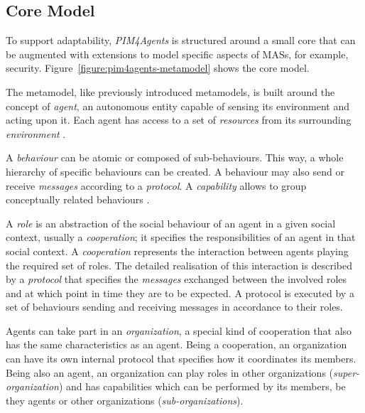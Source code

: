 \subsection*{Core Model}

To support adaptability, \textit{PIM4Agents} is structured around a small core that can be augmented with extensions to model specific aspects of MASs, for example, security.
Figure~\ref{figure:pim4agents-metamodel} shows the core model.

The metamodel, like previously introduced metamodels, is built around the concept of \textit{agent}, an autonomous entity capable of sensing its environment and acting upon it.
Each agent has access to a set of \textit{resources} from its surrounding \textit{environment} \cite{Hahn07b}.

A \textit{behaviour} can be atomic or composed of sub-behaviours.
This way, a whole hierarchy of specific behaviours can be created.
A behaviour may also send or receive \textit{messages} according to a \textit{protocol}.
A \textit{capability} allows to group conceptually related behaviours \cite{Hahn07b}.

A \textit{role} is an abstraction of the social behaviour of an agent in a given social context, usually a \textit{cooperation}; it specifies the responsibilities of an agent in that social context.
A \textit{cooperation} represents the interaction between agents playing the required set of roles.
The detailed realisation of this interaction is described by a \textit{protocol} that specifies the \textit{messages} exchanged between the involved roles and at which point in time they are to be expected.
A protocol is executed by a set of behaviours sending and receiving messages in accordance to their roles.

Agents can take part in an \textit{organization}, a special kind of cooperation that also has the same characteristics as an agent.
Being a cooperation, an organization can have its own internal protocol that specifies how it coordinates its members.
Being also an agent, an organization can play roles in other organizations (\textit{super-organization}) and has capabilities which can be performed by its members, be they agents or other organizations (\textit{sub-organizations}).

